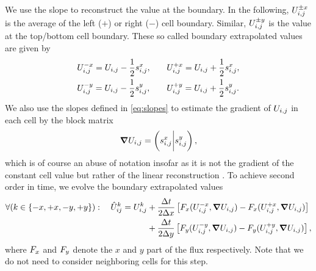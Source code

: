 We use the slope to reconstruct the value at the boundary.
In the following, $U_{i,j}^{\pm x}$ is the average of the left ($+$) or right ($-$) cell boundary.
Similar, $U_{i,j}^{\pm y}$ is the value at the top/bottom cell boundary.
These so called boundary extrapolated values are given by
\newcommand{\extrapolatedCellAvg}[3][i,j]{\cellAvg[#1]^{#3 #2} = \cellAvg #3 \frac{1}{2} \slope{#2}}
\begin{equation}
\begin{alignedat}{2}
& \extrapolatedCellAvg{x}{-} , \qquad && \extrapolatedCellAvg{x}{+}, \\
& \extrapolatedCellAvg{y}{-} , \qquad && \extrapolatedCellAvg{y}{+}.
\end{alignedat}
\end{equation}
We also use the slopes defined in \cref{eq:slopes} to estimate the gradient of $U_{i,j}$ in each cell by the block matrix
\begin{equation}
  \label{eq:muscl-gradient}
  \gradCellAvg = \left( \slope{x} \bigg\rvert \slope{y} \right),
\end{equation}
which is of course an abuse of notation insofar as it is not the gradient of the constant cell value but rather of the linear reconstruction .
To achieve second order in time, we evolve the boundary extrapolated values
\newcommand{\evolvedCellAvg}[2][i,j]{\hat{U}_{#1}^{#2}}
\begin{equation}\label{eq:muscl-time-evolution}
  \begin{split}
  \forall (k \in \{-x, +x, -y, +y \} ): \quad  \hat{U}_{ij}^k = \cellAvg^k &+
  \frac{\Delta t}{2 \Delta x} \left[ \fluxX(\cellAvg^{-x}, \gradCellAvg) - \fluxX(\cellAvg^{+x}, \gradCellAvg) \right] \\&+
  \frac{\Delta t}{2 \Delta y} \left[ \fluxY(\cellAvg^{-y}, \gradCellAvg) - \fluxY(\cellAvg^{+y}, \gradCellAvg) \right],
  \end{split}
\end{equation}
where $F_x$ and $F_y$ denote the $x$ and $y$ part of the flux respectively.
Note that we do not need to consider neighboring cells for this step.

